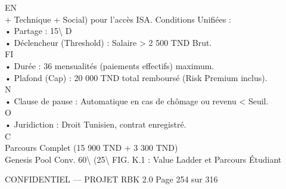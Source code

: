 EN\\
+ Technique + Social) pour l’accès ISA. Conditions Unifiées :\\
\vspace{0.5em}
• Partage : 15\textbackslash{}%
\vspace{0.5em}
\vspace{0.5em}
\vspace{0.5em}
\vspace{0.5em}
D\\
• Déclencheur (Threshold) : Salaire \textgreater{} 2 500 TND Brut.\\
\vspace{0.5em}
\vspace{0.5em}
\vspace{0.5em}
\vspace{0.5em}
FI\\
• Durée : 36 mensualités (paiements effectifs) maximum.\\
\vspace{0.5em}
• Plafond (Cap) : 20 000 TND total remboursé (Risk Premium inclus).\\
N\\
• Clause de pause : Automatique en cas de chômage ou revenu \textless{} Seuil.\\
O\\
• Juridiction : Droit Tunisien, contrat enregistré.\\
C\\
\vspace{0.5em}
\vspace{0.5em}
Parcours Complet (15 900 TND + 3 300 TND)\\
\vspace{0.5em}
\vspace{0.5em}
Genesis Pool  Conv. 60\textbackslash{}%
(25\textbackslash{}%
\vspace{0.5em}
FIG. K.1 : Value Ladder et Parcours Étudiant\\
\vspace{0.5em}
\vspace{0.5em}
\begin{confidential}CONFIDENTIEL — PROJET RBK 2.0                                           Page 254 sur 316\end{confidential}
